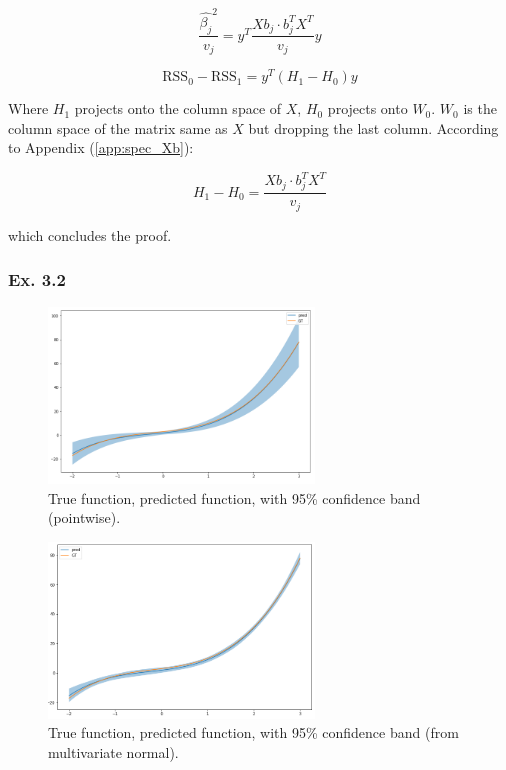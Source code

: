 \documentclass{article}
\begin{document}
\begin{equation}
    \frac{\hat{\beta_j}^2}{v_j} = y^T \frac{Xb_j \cdot b^T_j X^T}{v_j} y
\end{equation}

\begin{equation}
    \text{RSS}_0 - \text{RSS}_1 = y^T (H_1 - H_0) y
\end{equation}

Where $H_1$ projects onto the column space of $X$, $H_0$ projects onto $W_0$. $W_0$ is the column space of the matrix same as $X$ but dropping the last column. According to Appendix (\ref{app:spec_Xb}):

\begin{equation}
    H_1 - H_0 = \frac{Xb_j \cdot b^T_j X^T}{v_j}
\end{equation}

which concludes the proof.

\subsubsection{Ex. 3.2}

\begin{figure}[ht]
 \centering
  \includegraphics[width=200pt]{images/ex_3_2_a.png}
 \caption{True function, predicted function, with 95\% confidence band (pointwise).}
\end{figure}

\begin{figure}[ht]
 \centering
  \includegraphics[width=200pt]{images/ex_3_2_b.png}
 \caption{True function, predicted function, with 95\% confidence band (from multivariate normal).}
\end{figure}
\end{document}
